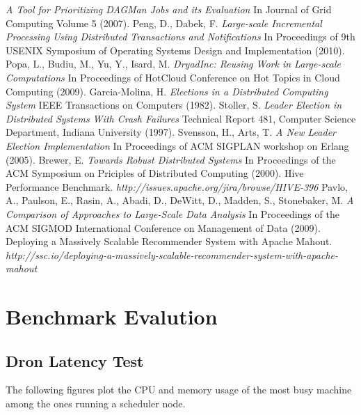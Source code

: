 \documentclass[11pt,a4paper,twoside]{report}
\begin{document}
\begin{thebibliography}{23}
 {\em A Tool for Prioritizing DAGMan Jobs and its Evaluation}
 In Journal of Grid Computing Volume 5 (2007).
 Peng, D., Dabek, F.
 {\em Large-scale Incremental Processing Using Distributed Transactions and
 Notifications}
 In Proceedings of 9th USENIX Symposium of Operating Systems Design and
 Implementation (2010).
 Popa, L., Budiu, M., Yu, Y., Isard, M.
 {\em DryadInc: Reusing Work in Large-scale Computations}
 In Proceedings of HotCloud Conference on Hot Topics in Cloud Computing (2009).
 Garcia-Molina, H.
 {\em Elections in a Distributed Computing System}
 IEEE Transactions on Computers (1982).
 Stoller, S.
 {\em Leader Election in Distributed Systems With Crash Failures}
 Technical Report 481, Computer Science Department, Indiana University (1997).
 Svensson, H., Arts, T.
 {\em A New Leader Election Implementation}
 In Proceedings of ACM SIGPLAN workshop on Erlang (2005).
 Brewer, E.
 {\em Towards Robust Distributed Systems}
 In Proceedings of the ACM Symposium on Priciples of Distributed Computing (2000).
 Hive Performance Benchmark.
 {\em http://issues.apache.org/jira/browse/HIVE-396}
 Pavlo, A., Paulson, E., Rasin, A., Abadi, D., DeWitt, D., Madden, S., Stonebaker, M.
 {\em A Comparison of Approaches to Large-Scale Data Analysis}
 In Proceedings of the ACM SIGMOD International Conference on Management of Data (2009).
 Deploying a Massively Scalable Recommender System with Apache Mahout.
 {\em http://ssc.io/deploying-a-massively-scalable-recommender-system-with-apache-mahout} 
\end{thebibliography}

\appendix
\chapter{Benchmark Evalution}
\label{chap:EvalQueries}

\section{Dron Latency Test}

The following figures plot the CPU and memory usage of the most busy machine among the ones running a scheduler node.
\end{document}
